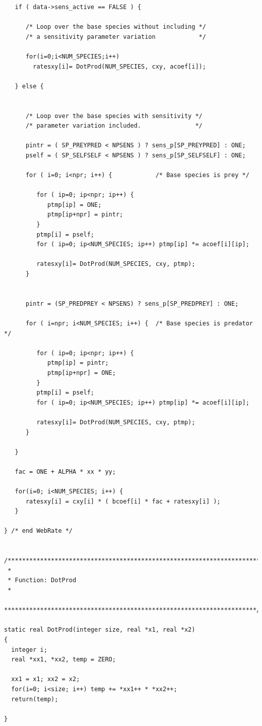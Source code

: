 \documentclass[11pt]{article}
\begin{document}
\begin{verbatim}
   if ( data->sens_active == FALSE ) {

      /* Loop over the base species without including */
      /* a sensitivity parameter variation            */

      for(i=0;i<NUM_SPECIES;i++)
        ratesxy[i]= DotProd(NUM_SPECIES, cxy, acoef[i]);

   } else {


      /* Loop over the base species with sensitivity */
      /* parameter variation included.               */

      pintr = ( SP_PREYPRED < NPSENS ) ? sens_p[SP_PREYPRED] : ONE;
      pself = ( SP_SELFSELF < NPSENS ) ? sens_p[SP_SELFSELF] : ONE;

      for ( i=0; i<npr; i++) {            /* Base species is prey */

         for ( ip=0; ip<npr; ip++) {
            ptmp[ip] = ONE;
            ptmp[ip+npr] = pintr;
         }
         ptmp[i] = pself;
         for ( ip=0; ip<NUM_SPECIES; ip++) ptmp[ip] *= acoef[i][ip];

         ratesxy[i]= DotProd(NUM_SPECIES, cxy, ptmp);
      }


      pintr = (SP_PREDPREY < NPSENS) ? sens_p[SP_PREDPREY] : ONE;

      for ( i=npr; i<NUM_SPECIES; i++) {  /* Base species is predator */

         for ( ip=0; ip<npr; ip++) {
            ptmp[ip] = pintr;
            ptmp[ip+npr] = ONE;
         }
         ptmp[i] = pself;
         for ( ip=0; ip<NUM_SPECIES; ip++) ptmp[ip] *= acoef[i][ip];

         ratesxy[i]= DotProd(NUM_SPECIES, cxy, ptmp);
      }

   }

   fac = ONE + ALPHA * xx * yy;

   for(i=0; i<NUM_SPECIES; i++) {
      ratesxy[i] = cxy[i] * ( bcoef[i] * fac + ratesxy[i] );
   }

} /* end WebRate */


/***********************************************************************
 *
 * Function: DotProd
 *
 **********************************************************************/

static real DotProd(integer size, real *x1, real *x2)
{
  integer i;
  real *xx1, *xx2, temp = ZERO;

  xx1 = x1; xx2 = x2;
  for(i=0; i<size; i++) temp += *xx1++ * *xx2++;
  return(temp);

}



\end{verbatim}
\end{document}
